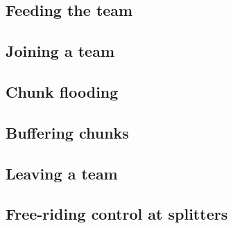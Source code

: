 

\subsection{Feeding the team}


\subsection{Joining a team}


\subsection{Chunk flooding}


\subsection{Buffering chunks}


\subsection{Leaving a team}


\subsection{Free-riding control at splitters}


%

%

\begin{comment}
\subsubsection{Flooding order}
\label{dbs:flooding_order}
As an incentive mechanism~\cite{xu2006analysis}, peers relay received
chunks first to those peers that 
\end{comment}

